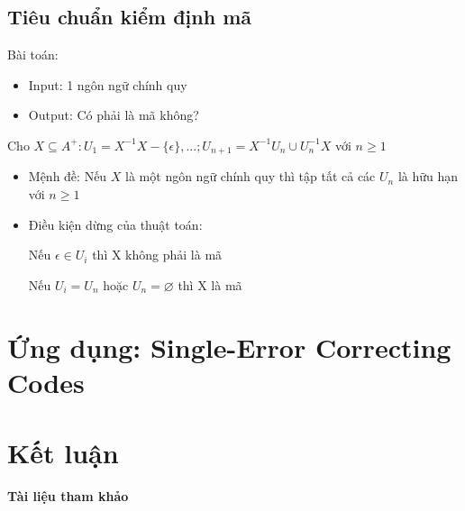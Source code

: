 \documentclass[14pt]{extreport}
\begin{document}
\section{Tiêu chuẩn kiểm định mã}
Bài toán:
\begin{itemize}
\item Input: 1 ngôn ngữ chính quy
\item Output: Có phải là mã không?
\end{itemize}
Cho $X\subseteq A^+: U_1=X^{-1}X-\{\epsilon\},...;U_{n+1}=X^{-1}U_n \cup U_n^{-1}X$ với $n\geq 1$
\begin{itemize}
\item Mệnh đề: Nếu $X$ là một ngôn ngữ chính quy thì tập tất cả các $U_n$ là hữu hạn với $n\geq 1$

\item Điều kiện dừng của thuật toán:

Nếu $\epsilon \in U_i $ thì X không phải là mã

Nếu $U_i=U_n$ hoặc $U_n=\varnothing$ thì X là mã
\end{itemize}

\chapter{Ứng dụng: Single-Error Correcting Codes}




\chapter{Kết luận}
{\huge \textbf{Tài liệu tham khảo}}
\end{document}
